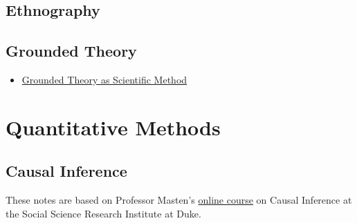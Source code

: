 \documentclass[]{book}
\providecommand{\tightlist}{%
  \setlength{\itemsep}{0pt}\setlength{\parskip}{0pt}}
\begin{document}
\hypertarget{ethnography}{%
\section{Ethnography}\label{ethnography}}

\hypertarget{grounded-theory}{%
\section{Grounded Theory}\label{grounded-theory}}

\begin{itemize}
\tightlist
\item
  \href{https://pdfs.semanticscholar.org/5886/43f9ded159acc42daeefed6f1d1952bea546.pdf}{Grounded Theory as Scientific Method}
\end{itemize}

\hypertarget{quantitative-methods}{%
\chapter{Quantitative Methods}\label{quantitative-methods}}

\hypertarget{causal-inference}{%
\section*{Causal Inference}\label{causal-inference}}

These notes are based on Professor Masten's \href{https://modu.ssri.duke.edu/topic/introduction-causal-inference}{online course} on Causal Inference at the Social Science Research Institute at Duke.
\end{document}
